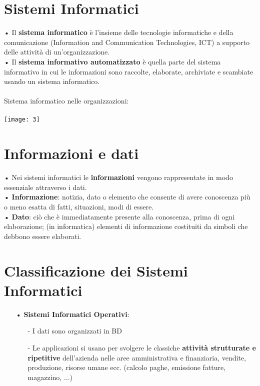 \documentclass[12pt, letterpaper]{article}
\begin{document}
\section{Sistemi Informatici}

• Il \textbf{sistema informatico} è l’insieme delle tecnologie informatiche e della
comunicazione (Information and Communication Technologies, ICT) a supporto
delle attività di un’organizzazione.
\\
• Il \textbf{sistema informativo automatizzato} è quella parte del sistema informativo in cui
le informazioni sono raccolte, elaborate, archiviate e scambiate usando un sistema
informatico.
\\
\\
Sistema informatico nelle organizzazioni:\\
\\
\texttt{[image: 3]}
\newpage
\section{Informazioni e dati}

• Nei \textbf{}sistemi informatici le \textbf{informazioni} vengono rappresentate in modo essenziale attraverso i dati.
\\
• \textbf{Informazione}: notizia, dato o elemento che consente di avere conoscenza più o
meno esatta di fatti, situazioni, modi di essere.
\\
• \textbf{Dato}: ciò che è immediatamente presente alla conoscenza, prima di ogni
elaborazione; (in informatica) elementi di informazione costituiti da simboli che
debbono essere elaborati.

\section{Classificazione dei Sistemi Informatici}
\begin{itemize}
   \item[•] \textbf{Sistemi Informatici Operativi}:
      \begin{itemize}
         \item[-] I dati sono organizzati in BD
         \item[-] Le applicazioni si usano per svolgere le classiche \textbf{attività strutturate e ripetitive}
dell'azienda nelle aree amministrativa e finanziaria, vendite, produzione, risorse
umane ecc. (calcolo paghe, emissione fatture, magazzino, ...)
      \end{itemize}
\end{itemize}
\end{document}

